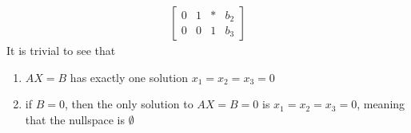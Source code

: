 \begin{itemize}
\begin{align*}
\begin{bmatrix}
        0 & 1 & * & b_2\\
        0 & 0 & 1 & b_3
      \end{bmatrix}
    \end{align*}
    It is trivial to see that
    \begin{enumerate}[label={(\alph*)}]
      \item $AX = B$ has exactly one solution $x_1 = x_2 = x_3 = 0$
      \item if $B = 0$, then the only solution to $AX = B = 0$ is $x_1 = x_2 = x_3 = 0$, meaning that the nullspace is $\emptyset$
    \end{enumerate}
\end{itemize}

